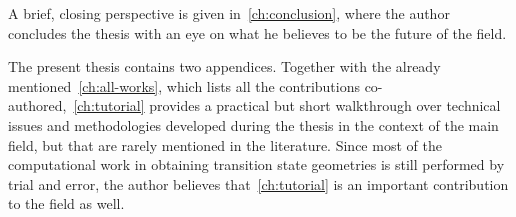 A brief, closing perspective is given in~\cref{ch:conclusion}, where
the author concludes the thesis with an eye on what he believes to be the
future of the field.

The present thesis contains two appendices.
Together with the already mentioned~\cref{ch:all-works}, which lists all
the contributions co-authored,~\cref{ch:tutorial} provides a practical but
short walkthrough over technical issues and methodologies developed during the
thesis in the context of the main field, but that are rarely mentioned in the
literature.
Since most of the computational work in obtaining transition state geometries
is still performed by trial and error, the author believes that~\cref{ch:tutorial} is an important contribution to the field as well.
